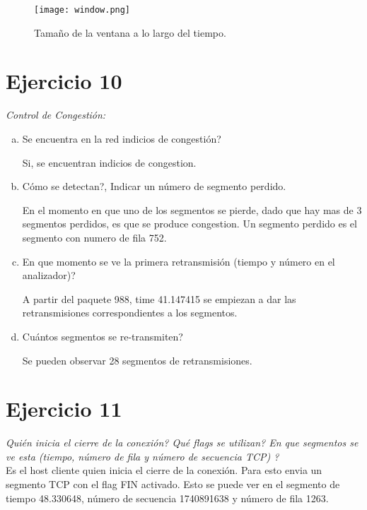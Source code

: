 \documentclass[osajnl,twocolumn,showpacs,superscriptaddress,10pt]{revtex4-1} %
\begin{document}
\begin{enumerate}[a)]
    \begin{figure}[H]
        \centering
        \texttt{[image: window.png]}
        \caption{Tamaño de la ventana a lo largo del tiempo.}
        \label{window}
    \end{figure}
\end{enumerate}

\section{Ejercicio 10}

\textit{Control de Congestión:}

\begin{enumerate}[a)]
    \item Se encuentra en la red indicios de congestión?

    Si, se encuentran indicios de congestion.

    \item Cómo se detectan?, Indicar un número de segmento perdido.

    En el momento en que uno de los segmentos se pierde, dado que hay mas de 3 segmentos perdidos, es que se produce congestion. Un segmento perdido es
    el segmento con numero de fila 752.

    \item En que momento se ve la primera retransmisión (tiempo y número en el analizador)?

    A partir del paquete 988, time 41.147415 se empiezan a dar las retransmisiones correspondientes a los segmentos.

    \item Cuántos segmentos se re-transmiten?

    Se pueden observar 28 segmentos de retransmisiones.
\end{enumerate}

\section{Ejercicio 11}

\textit{Quién inicia el cierre de la conexión? Qué flags se utilizan? En que segmentos se ve esta (tiempo, número de fila y número de secuencia TCP) ?} \\

Es el host cliente quien inicia el cierre de la conexión. Para esto envia un segmento TCP con el flag FIN activado. Esto se puede ver en el 
segmento de tiempo 48.330648, número de secuencia 1740891638 y número de fila 1263. \\
\end{document}
